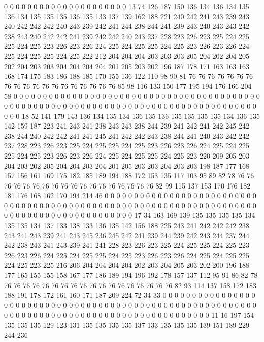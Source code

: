 0 0 0 0 0 0 0 0 0 0 0 0 0 0 0 0 0 0 0 0
0 13 74 126 187 150 136 134 136 134 135 136 134 135 135 135 136 135 133 137
139 162 188 221 240 242 241 243 239 243 240 242 242 242 240 243 239 242 241 244
238 244 241 239 243 240 243 243 242 238 243 240 242 242 241 239 242 242 240 243
237 228 223 226 223 225 224 225 225 224 225 223 226 223 226 224 225 224 225 225
224 225 223 226 223 226 224 225 224 225 225 224 225 222 212 204 204 204 203 203
203 205 204 202 204 205 202 204 203 203 204 204 204 204 201 205 203 202 196 187
178 171 163 163 163 168 174 175 183 186 188 185 170 155 136 122 110 98 90 81
76 76 76 76 76 76 76 76 76 76 76 76 76 76 76 76 76 76 76 85
98 116 133 150 177 195 194 176 166 204 58 0 0 0 0 0 0 0 0 0
0 0 0 0 0 0 0 0 0 0 0 0 0 0 0 0 0 0 0 0
0 0 0 0 0 0 0 0 0 0 0 0 0 0 0 0 0 0 0 0
0 0 0 0 0 0 0 0 0 0 0 0 0 0 0 0 0 0 0 0
0 0 0 0 0 0 0 0 0 0 0 0 0 0 0 0 0 0 0 18
52 141 179 143 136 134 135 134 136 135 136 135 135 135 135 134 136 135 142 159
187 223 241 243 241 238 243 243 238 244 239 241 242 241 242 245 242 238 244 240
242 242 241 241 245 241 242 242 243 238 244 241 240 243 242 242 237 228 223 226
223 225 224 225 225 224 225 223 226 223 226 224 225 224 225 225 224 225 223 226
223 226 224 225 224 225 225 224 225 223 220 209 205 203 204 203 202 205 204 204
203 204 201 205 203 203 204 203 203 198 187 177 168 157 156 161 169 175 182 185
189 194 188 172 153 135 117 103 95 89 82 78 76 76 76 76 76 76 76 76
76 76 76 76 76 76 76 76 76 76 82 99 115 137 153 170 176 182 181 176
168 162 170 194 214 46 0 0 0 0 0 0 0 0 0 0 0 0 0 0
0 0 0 0 0 0 0 0 0 0 0 0 0 0 0 0 0 0 0 0
0 0 0 0 0 0 0 0 0 0 0 0 0 0 0 0 0 0 0 0
0 0 0 0 0 0 0 0 0 0 0 0 0 0 0 0 0 0 0 0
0 0 0 0 0 0 0 0 0 0 0 0 0 0 0 0 0 17 34 163
169 139 135 135 135 135 134 135 135 134 137 133 138 133 136 135 142 156 188 225
243 241 242 242 242 238 243 241 243 239 241 243 245 236 245 242 241 239 244 239
242 243 244 237 244 242 238 243 241 243 239 241 241 228 223 226 223 225 224 225
225 224 225 223 226 223 226 224 225 224 225 225 224 225 223 226 223 226 224 225
224 225 225 224 225 223 225 216 206 204 204 204 204 202 203 204 205 203 202 200
196 188 177 165 155 155 158 167 177 186 189 194 196 192 178 157 137 112 95 91
86 82 78 76 76 76 76 76 76 76 76 76 76 76 76 76 76 76 76 76
76 82 93 114 137 158 172 183 188 191 178 172 161 160 171 187 209 224 72 34
33 0 0 0 0 0 0 0 0 0 0 0 0 0 0 0 0 0 0 0
0 0 0 0 0 0 0 0 0 0 0 0 0 0 0 0 0 0 0 0
0 0 0 0 0 0 0 0 0 0 0 0 0 0 0 0 0 0 0 0
0 0 0 0 0 0 0 0 0 0 0 0 0 0 0 0 0 0 0 0
0 0 0 0 0 0 0 0 0 0 0 0 0 0 0 11 16 197 154 135
135 135 129 123 131 135 135 135 135 137 133 135 135 135 139 151 189 229 244 236
